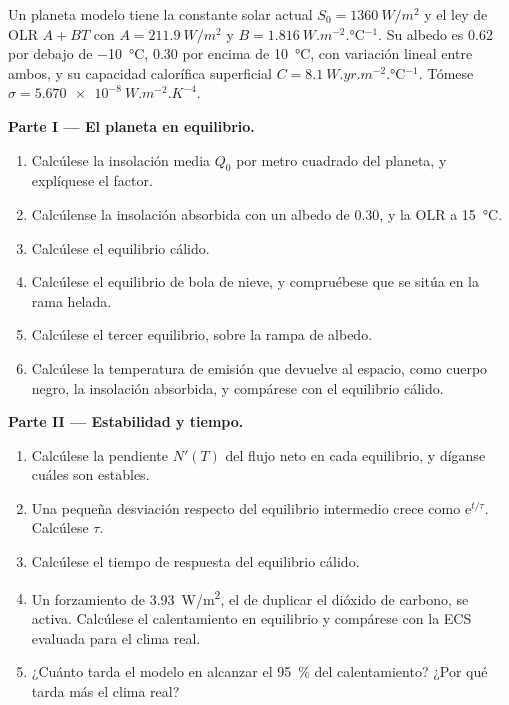 \begin{problem}
\label{pb:b3:climate-models:1}
Un planeta modelo tiene la constante solar actual $S_0 = \qty{1360}{W/m^2}$ y el
ley de OLR $A + BT$ con $A = \qty{211.9}{W/m^2}$ y $B =
\qty{1.816}{W.m^{-2}.\celsius^{-1}}$. Su albedo es 0.62 por debajo de
\qty{-10}{\celsius}, 0.30 por encima de \qty{+10}{\celsius}, con variación lineal entre ambos, y
su capacidad calorífica superficial $C = \qty{8.1}{W.yr.m^{-2}.\celsius^{-1}}$. Tómese
$\sigma = \qty{5.670e-8}{W.m^{-2}.K^{-4}}$.

\medskip\noindent\textbf{Parte I --- El planeta en equilibrio.}
\begin{enumerate}
\item Calcúlese la insolación media $Q_0$ por metro cuadrado del planeta, y
  explíquese el factor.
\item Calcúlense la insolación absorbida con un albedo de 0.30, y la OLR a
  \qty{15}{\celsius}.
\item Calcúlese el equilibrio cálido.
\item Calcúlese el equilibrio de bola de nieve, y compruébese que se sitúa en la
  rama helada.
\item Calcúlese el tercer equilibrio, sobre la rampa de albedo.
\item Calcúlese la temperatura de emisión que devuelve al espacio, como cuerpo negro,
  la insolación absorbida, y compárese con el equilibrio cálido.
\end{enumerate}

\medskip\noindent\textbf{Parte II --- Estabilidad y tiempo.}
\begin{enumerate}[resume]
\item Calcúlese la pendiente $N'(T)$ del flujo neto en cada equilibrio, y díganse
  cuáles son estables.
\item Una pequeña desviación respecto del equilibrio intermedio crece como $\mathrm
  e^{t/\tau}$. Calcúlese $\tau$.
\item Calcúlese el tiempo de respuesta del equilibrio cálido.
\item Un forzamiento de \qty{3.93}{W/m^2}, el de duplicar el dióxido de carbono,
  se activa. Calcúlese el calentamiento en equilibrio y compárese con
  la ECS evaluada para el clima real.
\item ¿Cuánto tarda el modelo en alcanzar el \qty{95}{\percent} del
  calentamiento? ¿Por qué tarda más el clima real?
\end{enumerate}


\end{problem}
